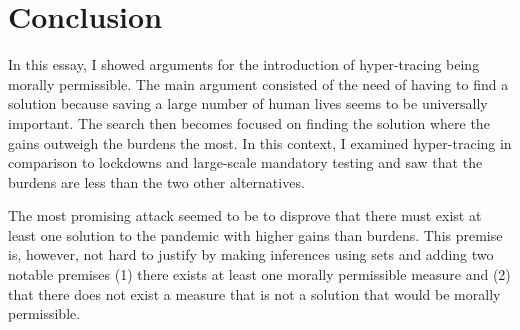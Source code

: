 \section{Conclusion}

In this essay, I showed arguments for the introduction of hyper-tracing being morally permissible.
The main argument consisted of the need of having to find a solution because saving a large number of human lives seems to be universally important.
The search then becomes focused on finding the solution where the gains outweigh the burdens the most. 
In this context, I examined hyper-tracing in comparison to lockdowns and large-scale mandatory testing and saw that the burdens are less than the two other alternatives.

The most promising attack seemed to be to disprove that there must exist at least one solution to the pandemic with higher gains than burdens.
This premise is, however, not hard to justify by making inferences using sets and adding two notable premises (1) there exists at least one morally permissible measure and (2) that there does not exist a measure that is not a solution that would be morally permissible.